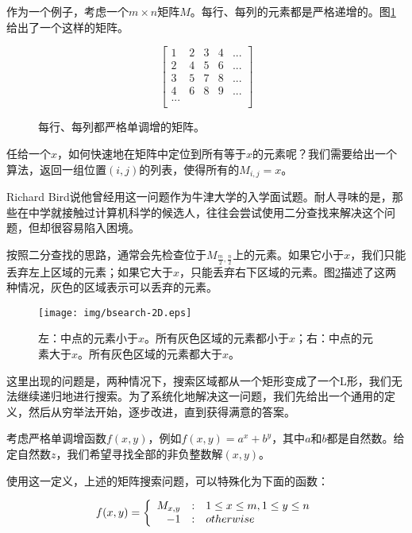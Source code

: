 \documentclass[UTF8]{article}
\begin{document}
作为一个例子，考虑一个$m \times n$矩阵$M$。每行、每列的元素都是严格递增的。图\ref{fig:matrix-eg}给出了一个这样的矩阵。

\begin{figure}[htbp]
 \centering
\[
\left [
  \begin{array}{ccccc}
    1 & 2 & 3 & 4 & ... \\
    2 & 4 & 5 & 6 & ... \\
    3 & 5 & 7 & 8 & ... \\
    4 & 6 & 8 & 9 & ... \\
    ... \\
  \end{array}
\right ]
\]
\caption{每行、每列都严格单调增的矩阵。}
\label{fig:matrix-eg}
\end{figure}

任给一个$x$，如何快速地在矩阵中定位到所有等于$x$的元素呢？我们需要给出一个算法，返回一组位置$(i, j)$的列表，使得所有的$M_{i,j} = x$。

Richard Bird说他曾经用这一问题作为牛津大学的入学面试题\cite{fp-pearls}。耐人寻味的是，那些在中学就接触过计算机科学的候选人，往往会尝试使用二分查找来解决这个问题，但却很容易陷入困境。

按照二分查找的思路，通常会先检查位于$M_{\frac{m}{2}, \frac{n}{2}}$上的元素。如果它小于$x$，我们只能丢弃左上区域的元素；如果它大于$x$，只能丢弃右下区域的元素。图\ref{fig:bsearch-2D}描述了这两种情况，灰色的区域表示可以丢弃的元素。

\begin{figure}[htbp]
 \centering
 \texttt{[image: img/bsearch-2D.eps]}
 \caption{左：中点的元素小于$x$。所有灰色区域的元素都小于$x$；右：中点的元素大于$x$。所有灰色区域的元素都大于$x$。}
 \label{fig:bsearch-2D}
\end{figure}

这里出现的问题是，两种情况下，搜索区域都从一个矩形变成了一个L形，我们无法继续递归地进行搜索。为了系统化地解决这一问题，我们先给出一个通用的定义，然后从穷举法开始，逐步改进，直到获得满意的答案。

考虑严格单调增函数$f(x, y)$，例如$f(x, y) = a^x + b^y$，其中$a$和$b$都是自然数。给定自然数$z$，我们希望寻找全部的非负整数解$(x, y)$。

使用这一定义，上述的矩阵搜索问题，可以特殊化为下面的函数：

\[
f(x, y) = \left \{
  \begin{array}
  {r@{\quad:\quad}l}
  M_{x, y} & 1 \leq x \leq m, 1 \leq y \leq n \\
  -1 & otherwise
  \end{array}
\right.
\]
\end{document}
